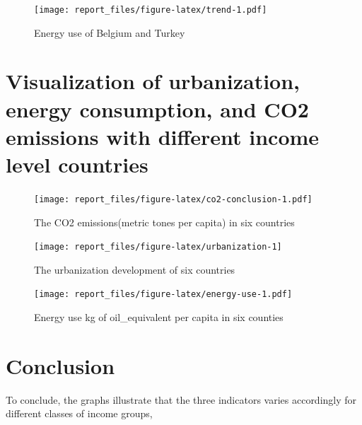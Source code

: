 \documentclass[11pt,a4paper,]{article}
\begin{document}
\begin{figure}
\centering
\texttt{[image: report\_files/figure-latex/trend-1.pdf]}
\caption{\label{fig:trend}Energy use of Belgium and Turkey}
\end{figure}

\hypertarget{visualization-of-urbanization-energy-consumption-and-co2-emissions-with-different-income-level-countries}{%
\section{Visualization of urbanization, energy consumption, and CO2 emissions with different income level countries}\label{visualization-of-urbanization-energy-consumption-and-co2-emissions-with-different-income-level-countries}}

\begin{figure}
\centering
\texttt{[image: report\_files/figure-latex/co2-conclusion-1.pdf]}
\caption{\label{fig:co2-conclusion}The CO2 emissions(metric tones per capita) in six countries}
\end{figure}

\begin{figure}

{\centering \texttt{[image: report\_files/figure-latex/urbanization-1]} 

}

\caption{The urbanization development of six countries}\label{fig:urbanization}
\end{figure}

\begin{figure}
\centering
\texttt{[image: report\_files/figure-latex/energy-use-1.pdf]}
\caption{\label{fig:energy-use}Energy use kg of oil\_equivalent per capita in six counties}
\end{figure}

\clearpage

\hypertarget{conclusion}{%
\section{Conclusion}\label{conclusion}}

To conclude, the graphs illustrate that the three indicators varies accordingly for different classes of income groups,
\end{document}
